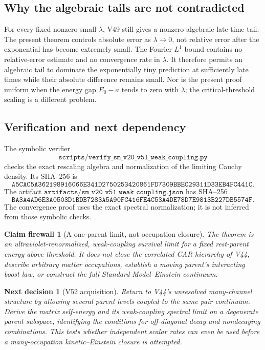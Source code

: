 \documentclass[11pt]{article}
\newtheorem{firewall}[theorem]{Claim firewall}
\newtheorem{decision}[theorem]{Next decision}
\theoremstyle{remark}
\begin{document}
\subsection{Why the algebraic tails are not contradicted}

For every fixed nonzero small \(\lambda\), V49 still gives
a nonzero algebraic late-time tail.  The present theorem
controls absolute error as \(\lambda\to0\), not relative
error after the exponential has become extremely small.
The Fourier \(L^1\) bound contains no relative-error estimate
and no convergence rate in \(\lambda\).  It therefore permits
an algebraic tail to dominate the exponentially tiny prediction
at sufficiently late times while their absolute difference
remains small.  Nor is the present proof uniform when the
energy gap \(E_0-a\) tends to zero with \(\lambda\); the
critical-threshold scaling is a different problem.

\subsection{Verification and next dependency}

The symbolic verifier
\[
 \texttt{scripts/verify\_sm\_v20\_v51\_weak\_coupling.py}
\]
checks the exact rescaling algebra and normalization of the
limiting Cauchy density.  Its SHA--256 is
\[
\texttt{A5CAC5A362198916066E341D2750253420861FD7309BBEC29311D33EB4FC441C}.
\]
The artifact
\(\texttt{artifacts/sm\_v20\_v51\_weak\_coupling.json}\)
has SHA--256
\[
\texttt{BA3A4AD6E3A0503D1BDB7283A5A90FC416FE4C53A4DE78D7E9813B227DB5574F}.
\]
The convergence proof uses the exact spectral normalization;
it is not inferred from those symbolic checks.

\begin{firewall}[A one-parent limit, not occupation closure]
\label{fire:v20v51}
The theorem is an ultraviolet-renormalized, weak-coupling
survival limit for a fixed rest-parent energy above threshold.
It does not close the correlated CAR hierarchy of V44,
describe arbitrary matter occupations, establish a moving
parent's interacting boost law, or construct the full
Standard Model--Einstein continuum.
\end{firewall}

\begin{decision}[V52 acquisition]
\label{dec:v20v51-next}
Return to V44's unresolved many-channel structure by allowing
several parent levels coupled to the same pair continuum.
Derive the matrix self-energy and its weak-coupling spectral
limit on a degenerate parent subspace, identifying the
conditions for off-diagonal decay and nondecaying combinations.
This tests whether independent scalar rates can even be used
before a many-occupation kinetic--Einstein closure is attempted.
\end{decision}
\end{document}
